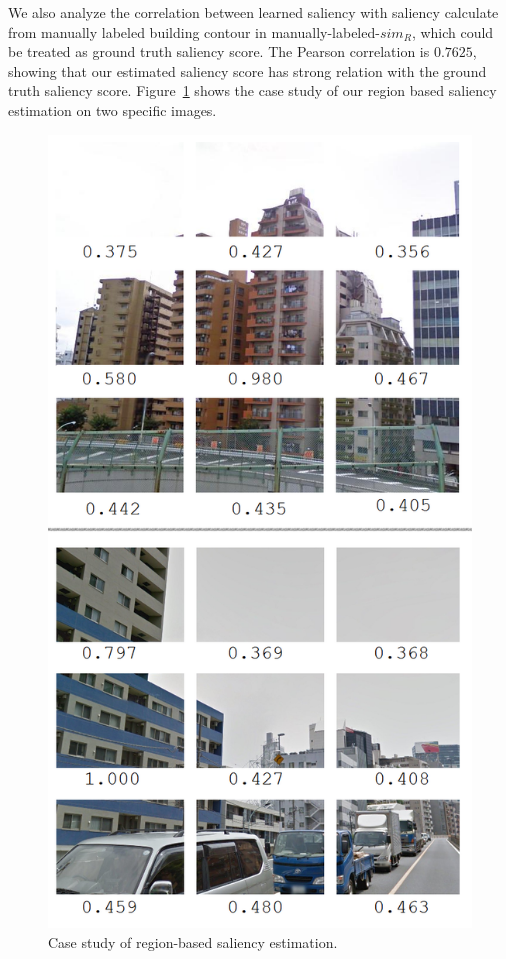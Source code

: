 We also analyze the correlation between learned saliency with saliency calculate from manually labeled building contour in manually-labeled-$sim_R$, which could be treated as ground truth saliency score. 
The Pearson correlation is $0.7625$, showing that our estimated saliency score has strong relation with the ground truth saliency score.
Figure~\ref{fig:saliencycasestudy} shows the case study of our region based saliency estimation on two specific images. 


\begin{figure}[H]
\includegraphics[width=0.68\linewidth]{img/case_study}
\caption{\label{fig:saliencycasestudy}Case study of region-based saliency estimation.}
\end{figure}
